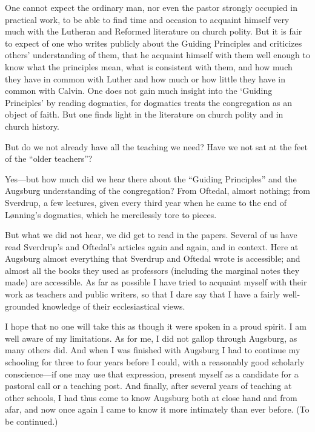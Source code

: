 One cannot expect the ordinary man, nor even the pastor strongly occupied in practical work, to be able to find time and occasion to acquaint himself very much with the Lutheran and Reformed literature on church polity. But it is fair to expect of one who writes publicly about the Guiding Principles and criticizes others’ understanding of them, that he acquaint himself with them well enough to know what the principles mean, what is consistent with them, and how much they have in common with Luther and how much or how little they have in common with Calvin. One does not gain much insight into the ‘Guiding Principles’ by reading dogmatics, for dogmatics treats the congregation as an object of faith. But one finds light in the literature on church polity and in church history.

But do we not already have all the teaching we need? Have we not sat at the feet of the “older teachers”?

Yes—but how much did we hear there about the “Guiding Principles” and the Augsburg understanding of the congregation? From Oftedal, almost nothing; from Sverdrup, a few lectures, given every third year when he came to the end of Lønning’s dogmatics, which he mercilessly tore to pieces.

But what we did not hear, we did get to read in the papers. Several of us have read Sverdrup’s and Oftedal’s articles again and again, and in context. Here at Augsburg almost everything that Sverdrup and Oftedal wrote is accessible; and almost all the books they used as professors (including the marginal notes they made) are accessible. As far as possible I have tried to acquaint myself with their work as teachers and public writers, so that I dare say that I have a fairly well-grounded knowledge of their ecclesiastical views.

I hope that no one will take this as though it were spoken in a proud spirit. I am well aware of my limitations. As for me, I did not gallop through Augsburg, as many others did. And when I was finished with Augsburg I had to continue my schooling for three to four years before I could, with a reasonably good scholarly conscience—if one may use that expression, present myself as a candidate for a pastoral call or a teaching post. And finally, after several years of teaching at other schools, I had thus come to know Augsburg both at close hand and from afar, and now once again I came to know it more intimately than ever before. (To be continued.)

